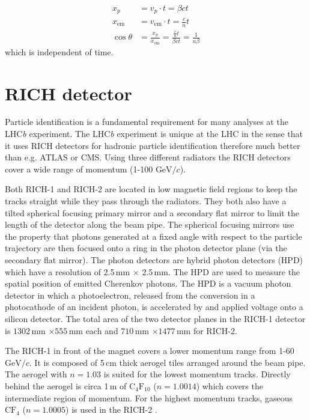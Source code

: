 \documentclass[11pt,twoside]{scrreprt}
\begin{document}
\begin{align}
    x_p &= v_{p}\cdot t = \beta c t \nonumber \\
    x_{\text{em}} &= v_{\text{em}}\cdot t=\frac{c}{n}t \nonumber \\
    \cos\theta &= \frac{x_{\text{p}}}{x_{\text{em}}} = \frac{\frac{c}{n}t}{\beta c t} = \frac{1}{n\beta} \nonumber
\end{align}
which is independent of time.

\section{RICH detector} %
\label{sec:rich_detector}

Particle identification is a fundamental requirement for many analyses at the LHC\textit{b} experiment. The LHC\textit{b} experiment is 
unique at the LHC in the sense that it uses RICH detectors for hadronic particle identification therefore much better than e.g. ATLAS 
or CMS. Using three different radiators the RICH detectors cover a wide range of momentum (1-100 $\text{GeV}/c$).

Both RICH-1 and RICH-2 are located in low magnetic field regions to keep the tracks straight while they pass through the radiators. They both 
also have a tilted spherical focusing primary mirror  and a secondary flat mirror to limit the length of the detector along the beam pipe.
The spherical focusing mirrors use the property that photons generated at a fixed angle with respect to the particle trajectory are then 
focused onto a ring in the photon detector plane (via the secondary flat mirror). The photon detectors are hybrid photon detectors (HPD)
which have a resolution of 2.5\,mm $\times$ 2.5\,mm. The HPD are used to measure the spatial position of emitted Cherenkov photons. The HPD
is a vacuum photon detector in which a photoelectron, released from the conversion in a photocathode of an incident photon, is accelerated
by and applied voltage onto a silicon detector\cite{AlvesJr2008}. The total area of the two detector planes in the RICH-1 detector is $1302$\,mm
$\times 555$\,mm each and $710$\,mm $\times 1477$\,mm for RICH-2.

The RICH-1 in front of the magnet covers a lower momentum range from 1-60 $\text{GeV}/c$. It is composed of 5\,cm thick aerogel tiles 
arranged around the beam pipe. The aerogel with $n=1.03$ is suited for the lowest momentum tracks. Directly behind the aerogel is 
circa 1\,m of $\text{C}_4\text{F}_{10}$ ($n=1.0014$) which covers the intermediate region of momentum. For the highest momentum tracks, 
gaseous $\text{C}\text{F}_4$ ($n=1.0005$) is used in the RICH-2 \cite{LHCb2000}.
\end{document}
